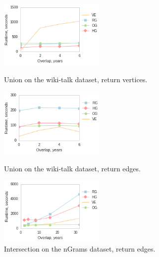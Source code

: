 \begin{figure}[h]
\begin{minipage}{2.2in}
\centering
\includegraphics[width=2in]{figs/union_wikitalk_vertices_build12.png}
\caption{Union on the wiki-talk dataset, return vertices.}
\label{fig:union1}
\end{minipage}
\begin{minipage}{2.2in}
\centering
\includegraphics[width=2in]{figs/union_wikitalk_edges_build12.png}
\caption{Union on the wiki-talk dataset, return edges.}
\label{fig:union2}
\end{minipage}
\begin{minipage}{2.2in}
\centering
\includegraphics[width=2in]{figs/intersect_ngrams_edges_build12.png}
\caption{Intersection on the nGrams dataset, return edges.}
\label{fig:intersect}
\end{minipage}
\end{figure}

